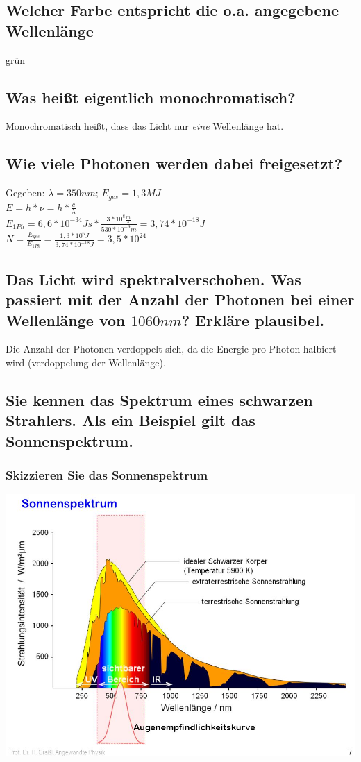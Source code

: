 \documentclass[12pt, a4paper]{article}
\begin{document}
\subsection{Welcher Farbe entspricht die o.a. angegebene Wellenlänge}
grün

\subsection{Was heißt eigentlich monochromatisch?}
Monochromatisch heißt, dass das Licht nur \textit{eine} Wellenlänge hat.

\subsection{Wie viele Photonen werden dabei freigesetzt?}
Gegeben: $\lambda=350nm$; $E_{ges}=1,3MJ$\\
$E=h*\nu=h*\frac{c}{\lambda}$\\
$E_{1Ph}=6,6*10^{-34}Js*\frac{3*10^8\frac{m}{s}}{530*10^{-9}m}=3,74*10^{-18}J$\\
$N=\frac{E_{ges}}{E_{1Ph}}=\frac{1,3*10^6J}{3,74*10^{-18}J}=3,5*10^{24}$

\subsection{Das Licht wird spektralverschoben. Was passiert mit der Anzahl der Photonen bei einer Wellenlänge von $1060nm$? Erkläre plausibel.}
Die Anzahl der Photonen verdoppelt sich, da die Energie pro Photon halbiert wird (verdoppelung der Wellenlänge).

\subsection{Sie kennen das Spektrum eines schwarzen Strahlers. Als ein Beispiel gilt das Sonnenspektrum.}
\subsubsection{Skizzieren Sie das Sonnenspektrum}
\includegraphics[width=\textwidth]{Sonnenspektrum.jpg}
\end{document}
